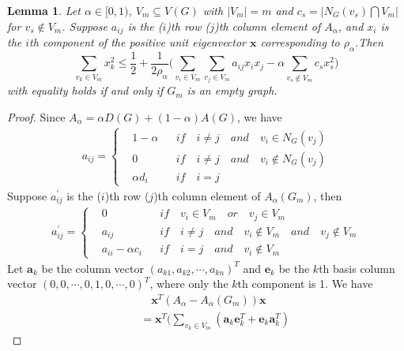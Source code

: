 \documentclass[amsthm]{elsart}
\newtheorem{lemma}{Lemma}[section]
\begin{document}
\begin{lemma} \label{lem:2.2}
Let $\alpha \in [0, 1)$, $V_m \subseteq V(G)$ with $|V_m|=m$ and $ c_s = |N_G(v_s) \bigcap V_m|$ for $v_s\notin V_m$.
Suppose $a_{ij}$ is the ($i$)th row ($j$)th column element of $A_\alpha$, and $x_i$ is the $i$th component of the positive unit eigenvector $\textbf{x}$ corresponding to $\rho_\alpha$.Then
\begin{equation} \label{equ:11}
\sum \limits_{v_k \in V_m}^{} x_k^2
\leqslant \frac{1}{2} + \frac{1}{2 \rho_\alpha} \Big( \sum \limits_{v_i \in V_m}^{} \sum \limits_{v_j \in V_m}^{} a_{ij} x_i x_j - \alpha \sum \limits_{v_s \notin V_m}^{} c_s x_s^2 \Big)
\end{equation}
with equality holds if and only if $G_m$ is an empty graph.
\end{lemma}
\begin{proof}
Since $A_\alpha = \alpha D(G) + (1 - \alpha)A(G)$, we have
\begin{eqnarray*}
 a_{ij} =
\left\{
\begin{aligned}
&1 - \alpha    && if \quad i \neq j  \quad and \quad v_i \in N_G(v_j) \\
&0    && if \quad i \neq j  \quad and \quad v_i \notin N_G(v_j) \\
&\alpha d_i    && if \quad i = j 
\end{aligned}
\right.
\end{eqnarray*}
Suppose   $a_{ij}^{\prime}$ is the ($i$)th row ($j$)th column element of $A_\alpha(G_m)$, then
\begin{eqnarray*}
 a_{ij}^{\prime} =
\left\{
\begin{aligned}
&0    && if \quad v_i \in V_m \quad or \quad v_j \in V_m \\
&a_{ij}    && if \quad i \neq j  \quad and \quad v_i \notin V_m  \quad and \quad v_j \notin V_m \\
&a_{ii} - \alpha c_i    && if \quad i = j \quad and \quad v_i \notin V_m
\end{aligned}
\right.
\end{eqnarray*}
Let $\textbf{a}_k$ be the column vector $(a_{k1}, a_{k2}, \cdots , a_{kn})^T$ and $\textbf{e}_k$ be the $k$th basis column vector $(0, 0, \cdots , 0, 1, 0, \cdots , 0)^T$,
 where only the $k$th component is 1. We have
\begin{eqnarray*}
 && \quad \textbf{x}^T(A_\alpha - A_\alpha(G_m))\textbf{x}
\\ &&= \textbf{x}^T \Big(\sum \limits_{v_k \in V_m}^{} (\textbf{a}_k \textbf{e}_k^T + \textbf{e}_k \textbf{a}_k^T)

\end{eqnarray*}
\end{proof}
\end{document}
